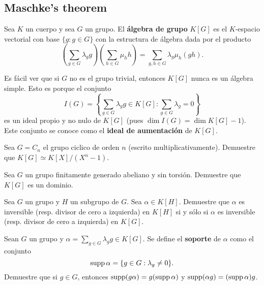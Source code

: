 \chapter{}

\section*{Maschke's theorem}

Sea $K$ un cuerpo y sea $G$ un grupo. El \textbf{álgebra de grupo} $K[G]$ es el
$K$-espacio vectorial con base $\{g:g\in G\}$ con la estructura de álgebra dada
por el producto
\[
	\left(\sum_{g\in G}\lambda_gg\right)\left(\sum_{h\in G}\mu_hh\right)
	=\sum_{g,h\in G}\lambda_g\mu_h(gh).
\]

Es fácil ver que si $G$ no es el grupo trivial, entonces $K[G]$ nunca es un álgebra simple. Esto es porque el conjunto 
\[
	I(G)=\left\{\sum_{g\in G}\lambda_gg\in K[G]:\sum_{g\in G}\lambda_g=0\right\}
\]
es un ideal propio y no nulo de $K[G]$ (pues $\dim I(G)=\dim K[G]-1$). Este
conjunto se conoce como el \textbf{ideal de aumentación} de $K[G]$.

\begin{exercise}
	Sea $G=C_n$ el grupo ciclico de orden $n$ (escrito multiplicativamente).
	Demuestre que $K[G]\simeq K[X]/(X^n-1)$. 
\end{exercise}

\begin{exercise}
	Sea $G$ un grupo finitamente generado abeliano y sin torsión. Demuestre que
	$K[G]$ es un dominio.
\end{exercise}

\begin{exercise}
	Sea $G$ un grupo y $H$ un subgrupo de $G$. Sea $\alpha\in K[H]$. Demuestre
	que $\alpha$ es inversible (resp. divisor de cero a izquierda) en $K[H]$ si
	y sólo si $\alpha$ es inversible (resp. divisor de cero a izquierda) en
	$K[G]$.
\end{exercise}

\begin{exercise}
	Sean $G$ un grupo y $\alpha=\sum_{g\in G}\lambda_gg\in K[G]$.  
	Se define el \textbf{soporte} de $\alpha$ como el conjunto
	\[
		\operatorname{supp}\alpha=\{g\in G:\lambda_g\ne 0\}.
	\]
	Demuestre que si $g\in G$, entonces
	$\operatorname{supp}(g\alpha)=g(\operatorname{supp}\alpha)$ y $\operatorname{supp}(\alpha g)=(\operatorname{supp}\alpha)g$.
\end{exercise}


